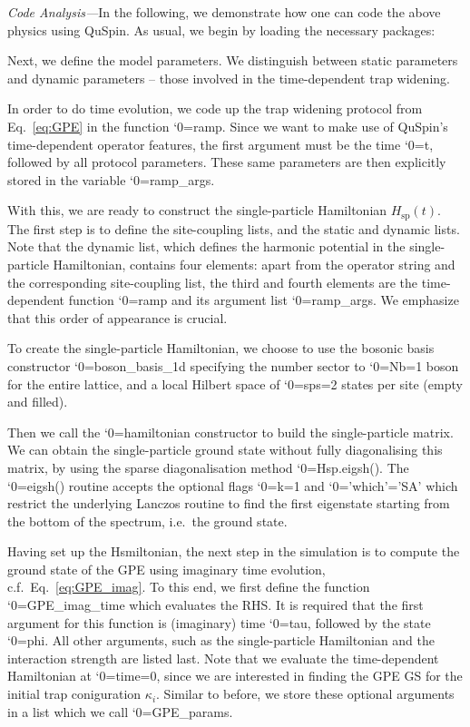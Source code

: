 \documentclass{SciPost}
\newcommand\0{\scalebox{-1}[1]{0}}
\let\svttfamily\ttfamily
\renewcommand\ttfamily{\svttfamily\catcode`0=\active }
\renewcommand\texttt{\bgroup\ttfamily\texttthelp}
\def\texttthelp#1{#1\egroup}
\newcommand{\GPcode}{example8.py}
\begin{document}
\noindent\emph{Code Analysis---}In the following, we demonstrate how one can code the above physics using QuSpin. As usual, we begin by loading the necessary packages:

Next, we define the model parameters. We distinguish between static parameters and dynamic parameters -- those involved in the time-dependent trap widening.

In order to do time evolution, we code up the trap widening protocol from Eq.~\eqref{eq:GPE} in the function \texttt{ramp}. Since we want to make use of QuSpin's time-dependent operator features, the first argument must be the time \texttt{t}, followed by all protocol parameters. These same parameters are then explicitly stored in the variable \texttt{ramp\_args}.

With this, we are ready to construct the single-particle Hamiltonian $H_\mathrm{sp}(t)$. The first step is to define the site-coupling lists, and the static and dynamic lists. Note that the dynamic list, which defines the harmonic potential in the single-particle Hamiltonian, contains four elements: apart from the operator string and the corresponding site-coupling list, the third and fourth elements are the time-dependent function \texttt{ramp} and its argument list \texttt{ramp\_args}. We emphasize that this order of appearance is crucial.

To create the single-particle Hamiltonian, we choose to use the bosonic basis constructor \texttt{boson\_basis\_1d} specifying the number sector to \texttt{Nb=1} boson for the entire lattice, and a local Hilbert space of \texttt{sps=2} states per site (empty and filled). 

Then we call the \texttt{hamiltonian} constructor to build the single-particle matrix. We can obtain the single-particle ground state without fully diagonalising this matrix, by using the sparse diagonalisation method \texttt{Hsp.eigsh()}. The \texttt{eigsh()} routine accepts the optional flags \texttt{k=1} and \texttt{'which'='SA'} which restrict the underlying Lanczos routine to find the first eigenstate starting from the bottom of the spectrum, i.e.~the ground state.	

Having set up the Hsmiltonian, the next step in the simulation is to compute the ground state of the GPE using imaginary time evolution, c.f.~Eq.~\eqref{eq:GPE_imag}. To this end, we first define the function \texttt{GPE\_imag\_time} which evaluates the RHS. It is required that the first argument for this function is (imaginary) time \texttt{tau}, followed by the state \texttt{phi}. All other arguments, such as the single-particle Hamiltonian and the interaction strength are listed last. Note that we evaluate the time-dependent Hamiltonian at \texttt{time=0}, since we are interested in finding the GPE GS for the initial trap coniguration $\kappa_i$. Similar to before, we store these optional arguments in a list which we call \texttt{GPE\_params}. 
\end{document}
